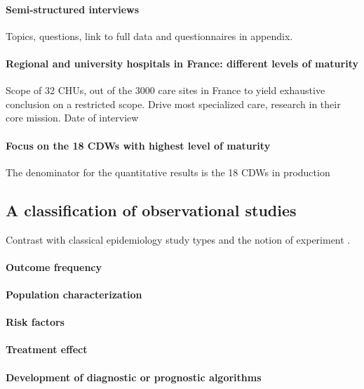 \documentclass{report}
\begin{document}
\paragraph{Semi-structured interviews}

Topics, questions, link to full data and questionnaires in appendix.

\paragraph{Regional and university hospitals in France: different levels of maturity}

Scope of 32 CHUs, out of the 3000 care sites in France to yield exhaustive
conclusion on a restricted scope. Drive most specialized care, research in their
core mission. Date of interview

\paragraph{Focus on the 18 CDWs with highest level of maturity}

The denominator for the quantitative results is the 18 CDWs in production

\subsection{A classification of observational studies}\label{subsec:cdw:classification}

Contrast with classical epidemiology study types and the notion of experiment \citep{rothman2012epidemiology}.

\paragraph{Outcome frequency}
\paragraph{Population characterization}
\paragraph{Risk factors}
\paragraph{Treatment effect}
\paragraph{Development of diagnostic or prognostic algorithms}
\end{document}
